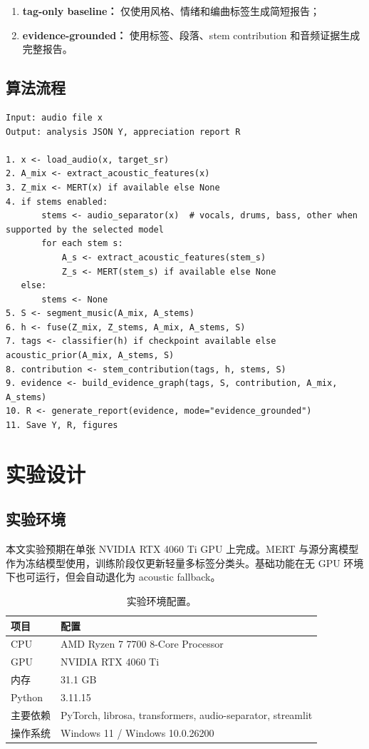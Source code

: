 \documentclass[UTF8,zihao=-4]{ctexart}
\begin{document}
\begin{enumerate}[leftmargin=2em]
    \item \textbf{tag-only baseline：} 仅使用风格、情绪和编曲标签生成简短报告；
    \item \textbf{evidence-grounded：} 使用标签、段落、stem contribution 和音频证据生成完整报告。
\end{enumerate}

\subsection{算法流程}

\begin{lstlisting}[caption={KPopScope 推理流程伪代码},label={alg:inference}]
Input: audio file x
Output: analysis JSON Y, appreciation report R

1. x <- load_audio(x, target_sr)
2. A_mix <- extract_acoustic_features(x)
3. Z_mix <- MERT(x) if available else None
4. if stems enabled:
       stems <- audio_separator(x)  # vocals, drums, bass, other when supported by the selected model
       for each stem s:
           A_s <- extract_acoustic_features(stem_s)
           Z_s <- MERT(stem_s) if available else None
   else:
       stems <- None
5. S <- segment_music(A_mix, A_stems)
6. h <- fuse(Z_mix, Z_stems, A_mix, A_stems, S)
7. tags <- classifier(h) if checkpoint available else acoustic_prior(A_mix, A_stems, S)
8. contribution <- stem_contribution(tags, h, stems, S)
9. evidence <- build_evidence_graph(tags, S, contribution, A_mix, A_stems)
10. R <- generate_report(evidence, mode="evidence_grounded")
11. Save Y, R, figures
\end{lstlisting}

\section{实验设计}

\subsection{实验环境}

本文实验预期在单张 NVIDIA RTX 4060 Ti GPU 上完成。MERT 与源分离模型作为冻结模型使用，训练阶段仅更新轻量多标签分类头。基础功能在无 GPU 环境下也可运行，但会自动退化为 acoustic fallback。

\begin{table}[H]
\centering
\caption{实验环境配置。}
\begin{tabular}{ll}
\toprule
项目 & 配置 \\
\midrule
CPU & AMD Ryzen 7 7700 8-Core Processor \\
GPU & NVIDIA RTX 4060 Ti \\
内存 & 31.1 GB \\
Python & 3.11.15 \\
主要依赖 & PyTorch, librosa, transformers, audio-separator, streamlit \\
操作系统 & Windows 11 / Windows 10.0.26200 \\
\bottomrule
\end{tabular}
\end{table}
\end{document}
